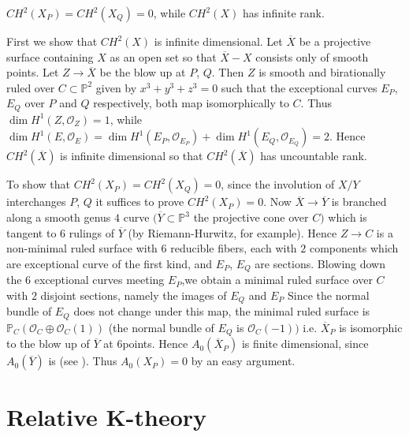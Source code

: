 \begin{cl}
$CH^{2}(X_P)=CH^{2}(X_Q)=0$, while $CH^{2}(X)$ has infinite rank. 
\end{cl}

First we show that $CH^{2}(X)$ is infinite dimensional. Let $\overline{X}$ be a projective surface containing $X$ as an open set so that $\overline{X}-X$ consists only of smooth points. Let $Z\to \overline{X}$ be the blow up at $P$, $Q$. Then $Z$ is smooth and birationally ruled over $C\subset \mathbb{P}^{2}$ given by $x^{3}+y^{3}+z^{3}=0$ such that the exceptional curves $E_P$, $E_Q$ over $P$ and $Q$ respectively, both map isomorphically to $C$. Thus $\dim H^{1}(Z,\mathscr{O}_Z)=1$, while $\dim H^{1}(E, \mathscr{O}_E)=\dim H^{1}(E_P,\mathscr{O}_{E_P})+\dim H^{1}(E_Q, \mathscr{O}_{E_Q})=2$. Hence $CH^{2}(\overline{X})$ is infinite dimensional so that $CH^{2}(\overline{X})$ has uncountable rank. 

To show that $CH^{2}(X_P)=CH^{2}(X_Q)=0$, since the involution of $X/Y$ interchanges $P$, $Q$ it suffices to prove $CH^{2}(X_P)=0$. Now $\overline{X}\to \overline{Y}$ is branched along a smooth genus $4$ curve $(\overline{Y}\subset \mathbb{P}^{3}$ the projective cone over $C)$ which is tangent to $6$ rulings of $\overline{Y}$ (by Riemann-Hurwitz, for example). Hence $Z\to C$ is a non-minimal ruled surface with $6$ reducible fibers, each with $2$ components which are exceptional curve of the first kind, and $E_P$, $E_Q$ are sections. Blowing down the $6$ exceptional curves meeting $E_P$,we obtain a minimal ruled surface over $C$ with $2$ disjoint sections, namely the images of $E_Q$ and $E_P$ Since the normal bundle of $E_Q$ does not change under this map, the minimal ruled surface is $\mathbb{P}_C(\mathscr{O}_C\oplus \mathscr{O}_C(1))$ (the normal bundle of $E_Q$ is $\mathscr{O}_C(-1))$ i.e. $\overline{X}_P$ is isomorphic to the blow up of $\overline{Y}$ at $6$\pageoriginale points. Hence $A_0(\overline{X}_P)$ is finite dimensional, since $A_0(\overline{Y})$ is (see \cite{Srinivasa}). Thus $A_0(X_P)=0$ by an easy argument. 

\section{Relative K-theory}

